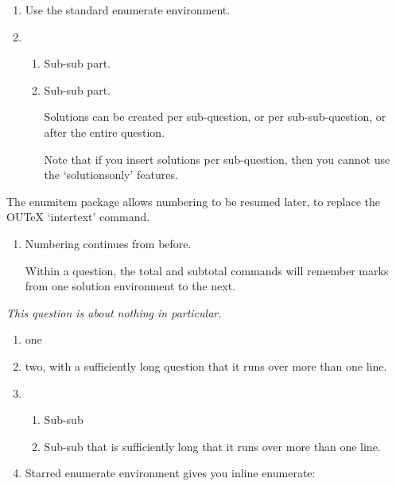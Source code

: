 \documentclass[remote,showsolutions]{ouexam}
\begin{document}
\begin{enumerate}
\item Use the standard enumerate environment.
\item \begin{enumerate}
\item Sub-sub part.
\item Sub-sub part.
\begin{solution}
Solutions can be created per sub-question, or per sub-sub-question, or after the entire question.

Note that if you insert solutions per sub-question, then you cannot use the `solutionsonly' features.
\end{solution}
\end{enumerate}
\end{enumerate}
The enumitem package allows numbering to be resumed later, to replace the OUTeX `intertext' command.
\begin{enumerate}[resume]
\item Numbering continues from before.
\begin{solution}
Within a question, the total and subtotal commands will remember marks from one solution environment to the next.

\total*
\end{solution}
\end{enumerate}

\question
\emph{This question is about nothing in particular.}
\begin{enumerate}
\item one
\item two, with a sufficiently long question that it runs over more than one line.
\item 
\begin{enumerate}
\item Sub-sub
\item Sub-sub that is sufficiently long that it runs over more than one line.
\end{enumerate}
\item Starred enumerate environment gives you inline enumerate:
\end{enumerate}
\end{document}
